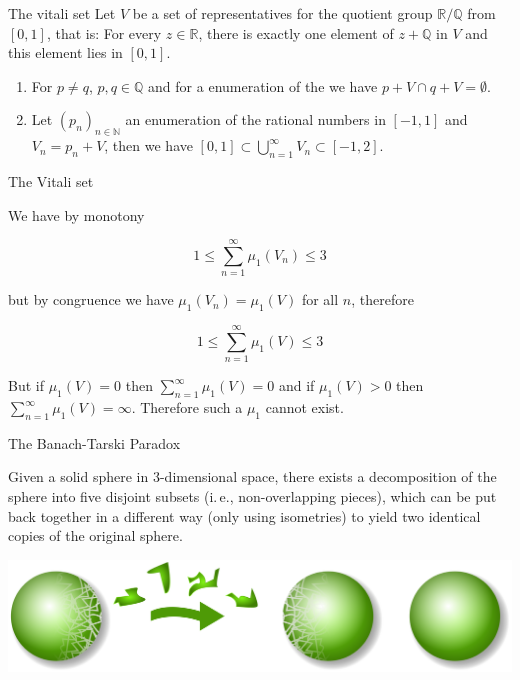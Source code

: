 \documentclass{beamer}
\newcommand{\RR}{\mathbb{R}}
\newcommand{\QQ}{\mathbb{Q}}
\newcommand{\NN}{\mathbb{N}}
\begin{document}
\begin{frame}{The vitali set}
  Let $V$ be a set of representatives for the quotient group $\RR/\QQ$
  from $[0,1]$, that is: For every $z \in \RR$, there is exactly one
  element of $z+\QQ$ in $V$ and this element lies in $[0,1]$.

  \begin{lemma}
    \begin{enumerate}
    \item For $p\neq q$, $p,q\in\QQ$ and for a enumeration of the we
      have $p+V \cap q+V = \emptyset$.
    \item Let $(p_n)_{n\in\NN}$ an enumeration of the rational numbers
      in $[-1,1]$ and $V_n=p_n + V$, then we have $[0,1] \subset
      \bigcup_{n=1}^{\infty} V_n \subset [-1, 2]$.
    \end{enumerate}
  \end{lemma}
\end{frame}

\begin{frame}{The Vitali set}

  We have by monotony
  
  \[1 \leq \sum_{n=1}^\infty \mu_1(V_n) \leq 3\]

  but by congruence we have $\mu_1(V_n) = \mu_1(V)$ for all $n$, therefore

  \[1 \leq \sum_{n=1}^\infty \mu_1(V) \leq 3\]

  But if $\mu_1(V)=0$ then $\sum_{n=1}^\infty \mu_1(V)=0$ and if
  $\mu_1(V)>0$ then $\sum_{n=1}^\infty \mu_1(V) = \infty$. Therefore
  such a $\mu_1$ cannot exist.

\end{frame}

\begin{frame}{The Banach-Tarski Paradox}
  \begin{theorem}
    Given a solid sphere in 3-dimensional space, there exists a decomposition of
    the sphere into five disjoint subsets (i.\,e., non-overlapping pieces),
    which can be put back together in a different way (only using isometries) to
    yield two identical copies of the original sphere.
  \end{theorem}
  \pause
  \includegraphics[width=\linewidth]{Banach-Tarski_Paradox-Illustration.png}
\end{frame}
\end{document}
